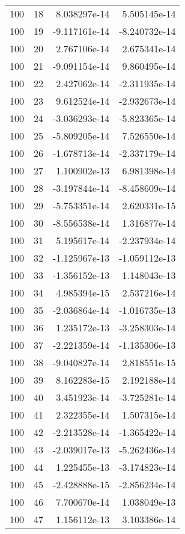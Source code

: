 \begin{tabular}{rrrr}
 100 &   18 &  8.038297e-14 &  5.505145e-14 \\
 100 &   19 & -9.117161e-14 & -8.240732e-14 \\
 100 &   20 &  2.767106e-14 &  2.675341e-14 \\
 100 &   21 & -9.091154e-14 &  9.860495e-14 \\
 100 &   22 &  2.427062e-14 & -2.311935e-14 \\
 100 &   23 &  9.612524e-14 & -2.932673e-14 \\
 100 &   24 & -3.036293e-14 & -5.823365e-14 \\
 100 &   25 & -5.809205e-14 &  7.526550e-14 \\
 100 &   26 & -1.678713e-14 & -2.337179e-14 \\
 100 &   27 &  1.100902e-13 &  6.981398e-14 \\
 100 &   28 & -3.197844e-14 & -8.458609e-14 \\
 100 &   29 & -5.753351e-14 &  2.620331e-15 \\
 100 &   30 & -8.556538e-14 &  1.316877e-14 \\
 100 &   31 &  5.195617e-14 & -2.237934e-14 \\
 100 &   32 & -1.125967e-13 & -1.059112e-13 \\
 100 &   33 & -1.356152e-13 &  1.148043e-13 \\
 100 &   34 &  4.985394e-15 &  2.537216e-14 \\
 100 &   35 & -2.036864e-14 & -1.016735e-13 \\
 100 &   36 &  1.235172e-13 & -3.258303e-14 \\
 100 &   37 & -2.221359e-14 & -1.135306e-13 \\
 100 &   38 & -9.040827e-14 &  2.818551e-15 \\
 100 &   39 &  8.162283e-15 &  2.192188e-14 \\
 100 &   40 &  3.451923e-14 & -3.725281e-14 \\
 100 &   41 &  2.322355e-14 &  1.507315e-14 \\
 100 &   42 & -2.213528e-14 & -1.365422e-14 \\
 100 &   43 & -2.039017e-13 & -5.262436e-14 \\
 100 &   44 &  1.225455e-13 & -3.174823e-14 \\
 100 &   45 & -2.428888e-15 & -2.856234e-14 \\
 100 &   46 &  7.700670e-14 &  1.038049e-13 \\
 100 &   47 &  1.156112e-13 &  3.103386e-14 \\

\end{tabular}
